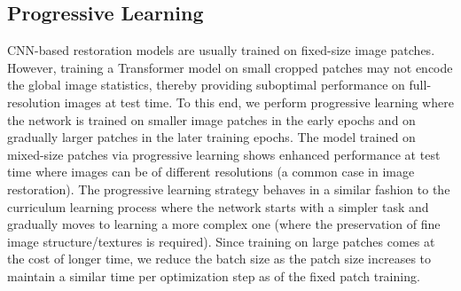\documentclass[10pt,twocolumn,letterpaper]{article}
\begin{document}
\subsection{Progressive Learning}\label{Progressive Learning}
CNN-based restoration models are usually trained on fixed-size image patches. 
However, training a Transformer model on small cropped patches may not encode the global image statistics, thereby providing suboptimal performance on full-resolution images at test time.  To this end, we perform progressive learning where the network is trained on smaller image patches in the early epochs and on gradually larger patches in the later training epochs. The model trained on mixed-size patches via progressive learning shows enhanced performance at test time where images can be of different resolutions (a common case in image restoration). The progressive learning strategy behaves in a similar fashion to the curriculum learning process where the network starts with a simpler task and gradually moves to learning a more complex one (where the preservation of fine image structure/textures is required). Since training on large patches comes at the cost of longer time, we reduce the batch size as the patch size increases to maintain {a} similar time per optimization step as of the fixed patch training. 
\end{document}
